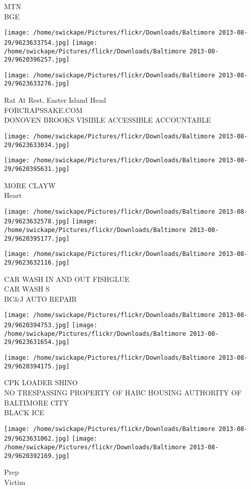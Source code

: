 \documentclass[10pt,letterpaper]{article}
\begin{document}
MTN\\
BGE\\
\pagebreak

\texttt{[image: /home/swickape/Pictures/flickr/Downloads/Baltimore 2013-08-29/9623633754.jpg]}
\texttt{[image: /home/swickape/Pictures/flickr/Downloads/Baltimore 2013-08-29/9620396257.jpg]}

\texttt{[image: /home/swickape/Pictures/flickr/Downloads/Baltimore 2013-08-29/9623633276.jpg]}

Rat At Rest, Easter Island Head\\
FORCRAPSSAKE.COM\\
DONOVEN BROOKS VISIBLE ACCESSIBLE ACCOUNTABLE\\
\pagebreak

\texttt{[image: /home/swickape/Pictures/flickr/Downloads/Baltimore 2013-08-29/9623633034.jpg]}

\vspace{0.25in}
\texttt{[image: /home/swickape/Pictures/flickr/Downloads/Baltimore 2013-08-29/9620395631.jpg]}

MORE CLAYW\\
Heart\\
\pagebreak

\texttt{[image: /home/swickape/Pictures/flickr/Downloads/Baltimore 2013-08-29/9623632578.jpg]}
\texttt{[image: /home/swickape/Pictures/flickr/Downloads/Baltimore 2013-08-29/9620395177.jpg]}

\vspace{0.25in}
\texttt{[image: /home/swickape/Pictures/flickr/Downloads/Baltimore 2013-08-29/9623632116.jpg]}

CAR WASH IN AND OUT FISHGLUE\\
CAR WASH S\\
BC\&J AUTO REPAIR\\
\pagebreak

\texttt{[image: /home/swickape/Pictures/flickr/Downloads/Baltimore 2013-08-29/9620394753.jpg]}
\texttt{[image: /home/swickape/Pictures/flickr/Downloads/Baltimore 2013-08-29/9623631654.jpg]}

\vspace{0.25in}
\texttt{[image: /home/swickape/Pictures/flickr/Downloads/Baltimore 2013-08-29/9620394175.jpg]}

CPK LOADER SHINO\\
NO TRESPASSING PROPERTY OF HABC HOUSING AUTHORITY OF BALTIMORE CITY\\
BLACK ICE\\
\pagebreak

\texttt{[image: /home/swickape/Pictures/flickr/Downloads/Baltimore 2013-08-29/9623631062.jpg]}
\texttt{[image: /home/swickape/Pictures/flickr/Downloads/Baltimore 2013-08-29/9620392169.jpg]}

Prep\\
Victim\\
\pagebreak
\end{document}
